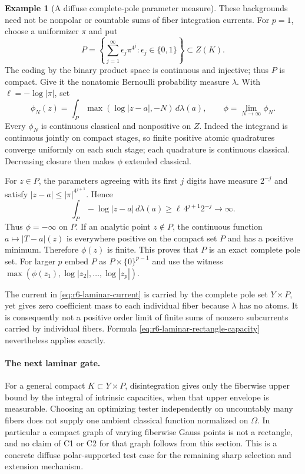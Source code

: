\documentclass[11pt,a4paper]{article}
\numberwithin{equation}{section}
\theoremstyle{definition}
\newtheorem{example}[theorem]{Example}
\theoremstyle{remark}
\begin{document}
\begin{example}[A diffuse complete-pole parameter measure]
\label{ex:r6-diffuse-polar-parameters}
These backgrounds need not be nonpolar or countable sums of fiber
integration currents. For $p=1$, choose a uniformizer $\pi$ and put
\[
 P=\left\{\sum_{j=1}^{\infty}\epsilon_j\pi^{4^j}:
                          \epsilon_j\in\{0,1\}\right\}\subset Z(K).
\]
The coding by the binary product space is continuous and injective;
thus $P$ is compact. Give it the nonatomic Bernoulli probability
measure $\lambda$. With $\ell=-\log|\pi|$, set
\[
 \phi_N(z)=\int_P\max(\log|z-a|,-N)\,d\lambda(a),
               \qquad \phi=\lim_{N\to\infty}\phi_N.
\]
Every $\phi_N$ is continuous classical and nonpositive on $Z$.
Indeed the integrand is continuous jointly on compact stages, so
finite positive atomic quadratures converge uniformly on each such
stage; each quadrature is continuous classical. Decreasing closure
then makes $\phi$ extended classical.

For $z\in P$, the parameters agreeing with its first $j$ digits have
measure $2^{-j}$ and satisfy $|z-a|\leq|\pi|^{4^{j+1}}$. Hence
\[
       \int_P-\log|z-a|\,d\lambda(a)
                         \geq\ell\,4^{j+1}2^{-j}\longrightarrow\infty.
\]
Thus $\phi=-\infty$ on $P$. If an analytic point $z\notin P$, the
continuous function $a\mapsto|T-a|(z)$ is everywhere positive on the
compact set $P$ and has a positive minimum. Therefore $\phi(z)$ is
finite. This proves that $P$ is an exact complete pole set. For larger
$p$ embed $P$ as $P\times\{0\}^{p-1}$ and use the witness
$\max(\phi(z_1),\log|z_2|,\ldots,\log|z_p|)$.

The current in \eqref{eq:r6-laminar-current} is carried by the complete
pole set $Y\times P$, yet gives zero coefficient mass to each
individual fiber because $\lambda$ has no atoms. It is consequently
not a positive order limit of finite sums of nonzero subcurrents
carried by individual fibers. Formula
\eqref{eq:r6-laminar-rectangle-capacity} nevertheless applies exactly.
\end{example}

\paragraph{The next laminar gate.}
For a general compact $K\subset Y\times P$, disintegration gives only
the fiberwise upper bound by the integral of intrinsic capacities,
when that upper envelope is measurable. Choosing an optimizing tester
independently on uncountably many fibers does not supply one ambient
classical function normalized on $\Omega$. In particular a compact
graph of varying fiberwise Gauss points is not a rectangle, and no
claim of C1 or C2 for that graph follows from this section. This is a
concrete diffuse polar-supported test case for the remaining sharp
selection and extension mechanism.
\end{document}
